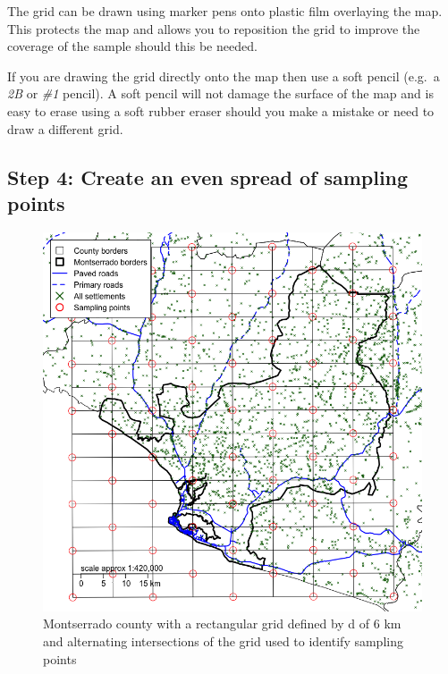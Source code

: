 \documentclass[12pt,a4paper]{book}
\theoremstyle{definition}
\theoremstyle{definition}
\theoremstyle{definition}
\theoremstyle{remark}
\begin{document}
The grid can be drawn using marker pens onto plastic film overlaying the
map. This protects the map and allows you to reposition the grid to
improve the coverage of the sample should this be needed.

If you are drawing the grid directly onto the map then use a soft pencil
(e.g.~a \emph{2B} or \emph{\#1} pencil). A soft pencil will not damage
the surface of the map and is easy to erase using a soft rubber eraser
should you make a mistake or need to draw a different grid.

\newpage

\hypertarget{step-4-create-an-even-spread-of-sampling-points}{%
\subsection{Step 4: Create an even spread of sampling
points}\label{step-4-create-an-even-spread-of-sampling-points}}

\begin{figure}[H]

{\centering \includegraphics{figures/grid2-1} 

}

\caption{Montserrado county with a rectangular grid defined by d of 6 km and alternating intersections of the grid used to identify sampling points}\label{fig:grid2}
\end{figure}
\end{document}
